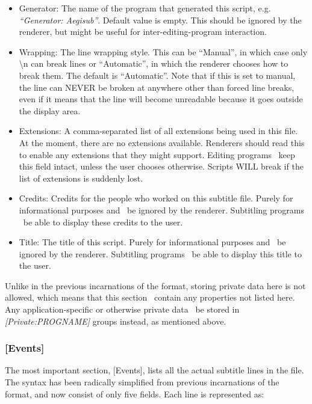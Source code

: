 \documentclass{spec}
\begin{document}
\begin{itemize}
\item Generator: The name of the program that generated this script, e.g. \textit{``Generator: Aegisub''}.
Default value is empty. This should be ignored by the renderer, but might be useful for inter-editing-program
interaction.
\item Wrapping: The line wrapping style. This can be ``Manual'', in which case only \textbackslash{n} can
break lines or ``Automatic'', in which the renderer chooses how to break them. The default is ``Automatic''.
Note that if this is set to manual, the line can NEVER be broken at anywhere other than forced line breaks,
even if it means that the line will become unreadable because it goes outside the display area.
\item Extensions: A comma-separated list of all extensions being used in this file. At the moment, there are
no extensions available. Renderers should read this to enable any extensions that they might support.
Editing programs \must\ keep this field intact, unless the user chooses otherwise. Scripts WILL break
if the list of extensions is suddenly lost.
\item Credits: Credits for the people who worked on this subtitle file. Purely for informational purposes and
\should\ be ignored by the renderer. Subtitling programs \should\ be able to display these credits to the user.
\item Title: The title of this script. Purely for informational purposes and \should\ be ignored by the renderer.
Subtitling programs \should\ be able to display this title to the user.
\end{itemize}

Unlike in the previous incarnations of the format, storing private data here is not allowed, which means
that this section \mustnot\ contain any properties not listed here. Any application-specific or otherwise
private data \must\ be stored in \textit{[Private:PROGNAME]} groups instead, as mentioned above.


\subsubsection{[Events]}

The most important section, [Events], lists all the actual subtitle lines in the file. The syntax has
been radically simplified from previous incarnations of the format, and now consist of only five fields.
Each line is represented as:
\end{document}
